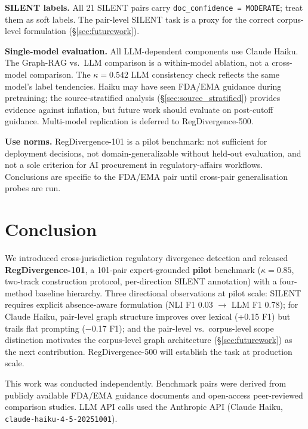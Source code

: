 \documentclass[manuscript]{acmart}
\begin{document}
\textbf{SILENT labels.} All 21 SILENT pairs carry \texttt{doc\_confidence = MODERATE};
treat them as soft labels. The pair-level SILENT task is a proxy for the correct
corpus-level formulation (\S\ref{sec:futurework}).

\textbf{Single-model evaluation.} All LLM-dependent components use Claude Haiku.
The Graph-RAG vs.\ LLM comparison is a within-model ablation, not a cross-model
comparison. The $\kappa = 0.542$ LLM consistency check reflects the same model's
label tendencies. Haiku may have seen FDA/EMA guidance during pretraining; the
source-stratified analysis (\S\ref{sec:source_stratified}) provides evidence
against inflation, but future work should evaluate on post-cutoff guidance.
Multi-model replication is deferred to RegDivergence-500.

\textbf{Use norms.} RegDivergence-101 is a pilot benchmark: not sufficient for
deployment decisions, not domain-generalizable without held-out evaluation, and
not a sole criterion for AI procurement in regulatory-affairs workflows.
Conclusions are specific to the FDA/EMA pair until cross-pair generalisation
probes are run.

\section{Conclusion}

We introduced cross-jurisdiction regulatory divergence detection and released
\textbf{RegDivergence-101}, a 101-pair expert-grounded \textbf{pilot} benchmark
($\kappa = 0.85$, two-track construction protocol, per-direction SILENT
annotation) with a four-method baseline hierarchy. Three directional
observations at pilot scale: SILENT requires explicit absence-aware formulation
(NLI F1 0.03 $\to$ LLM F1 0.78); for Claude Haiku, pair-level graph structure
improves over lexical (+0.15 F1) but trails flat prompting ($-$0.17 F1); and
the pair-level vs.\ corpus-level scope distinction motivates the corpus-level
graph architecture (\S\ref{sec:futurework}) as the next contribution.
RegDivergence-500 will establish the task at production scale.

\begin{acks}
This work was conducted independently. Benchmark pairs were derived from
publicly available FDA/EMA guidance documents and open-access peer-reviewed
comparison studies. LLM API calls used the Anthropic API (Claude Haiku,
\texttt{claude-haiku-4-5-20251001}).
\end{acks}
\end{document}
